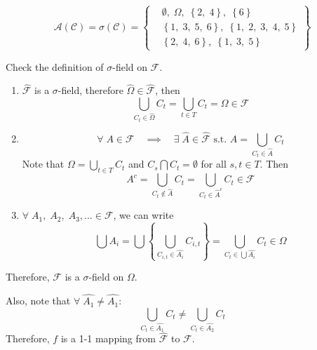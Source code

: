 \begin{list}{1.9.}{}
\item
  \[
    \mathcal{A}\left(\mathcal{C}\right) = \sigma\left(\mathcal{C}\right) =
    \left\{
      \begin{aligned}
        & \emptyset,\; \Omega,\; \left\{2,\; 4\right\},\; \left\{6\right\}    \\
        & \left\{1,\; 3,\; 5,\; 6\right\},\; \left\{1,\; 2,\; 3,\; 4,\; 5\right\}    \\
        & \left\{2,\; 4,\; 6\right\},\; \left\{1,\; 3,\; 5\right\}
      \end{aligned}
    \right\}
  \]
  
\item Check the definition of $\sigma$-field on $\mathcal{F}$.
  \begin{enumerate}
  \item $\hat{\mathcal{F}}$ is a $\sigma$-field, therefore $\hat{\Omega}\in\hat{\mathcal{F}}$, then
    \[
      \bigcup\limits_{C_t\in\hat{\Omega}}C_t = \bigcup\limits_{t\in T}C_t = \Omega \in \mathcal{F}
    \]
    
  \item
    \[
      \forall\; A \in \mathcal{F}
      \quad\implies\quad
      \exists\; \hat{A}\in\hat{\mathcal{F}} \text{ s.t. } A = \bigcup\limits_{C_t\in\hat{A}}C_t
    \]
    Note that $\Omega = \bigcup\limits_{t\in T}C_t $ and $C_s \bigcap C_t = \emptyset$ for all $s,t\in T$. Then
    \[
      A^c = \bigcup\limits_{C_t\notin \hat{A}}C_t = \bigcup\limits_{C_t\in\hat{A}^c} C_t \in \mathcal{F}
    \]
    
  \item $\forall\; A_1,\; A_2,\; A_3,\dots\in\mathcal{F}$, we can write
    \[
      \bigcup A_i = \bigcup\left\{
        \bigcup\limits_{C_{i,t}\in\hat{A_i}}C_{i,t}
      \right\}
      = \bigcup\limits_{C_t\in\bigcup \hat{A_i}}C_t
      \in \Omega
    \]
  \end{enumerate}
  Therefore, $\mathcal{F}$ is a $\sigma$-field on $\Omega$.
  \par
  Also, note that $\forall\;\hat{A_1} \neq \hat{A_1}$:
  \[
    \bigcup_{C_t\in\hat{A_1}}C_t \neq \bigcup\limits_{C_t\in\hat{A_2}}C_t
  \]
  Therefore, $f$ is a 1-1 mapping from $\hat{\mathcal{F}}$ to $\mathcal{F}$.
  

\end{list}
